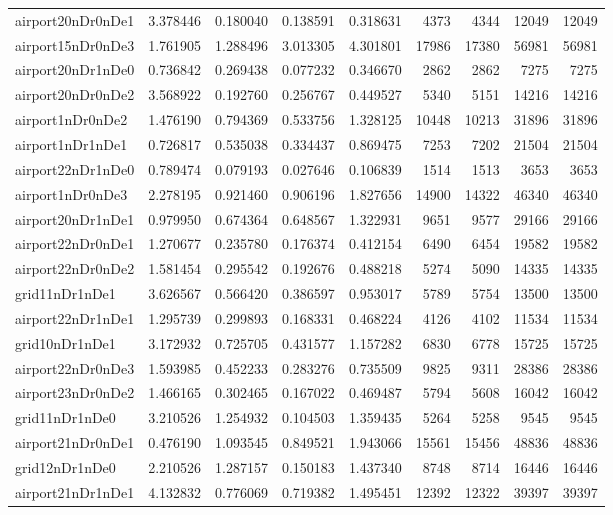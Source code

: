 \begin{longtable}{|l|r|r|r|r|r|r|r|r|}
airport20nDr0nDe1 & 3.378446 & 0.180040 & 0.138591 & 0.318631 & 4373 & 4344 & 12049 & 12049 \\
airport15nDr0nDe3 & 1.761905 & 1.288496 & 3.013305 & 4.301801 & 17986 & 17380 & 56981 & 56981 \\
airport20nDr1nDe0 & 0.736842 & 0.269438 & 0.077232 & 0.346670 & 2862 & 2862 & 7275 & 7275 \\
airport20nDr0nDe2 & 3.568922 & 0.192760 & 0.256767 & 0.449527 & 5340 & 5151 & 14216 & 14216 \\
airport1nDr0nDe2 & 1.476190 & 0.794369 & 0.533756 & 1.328125 & 10448 & 10213 & 31896 & 31896 \\
airport1nDr1nDe1 & 0.726817 & 0.535038 & 0.334437 & 0.869475 & 7253 & 7202 & 21504 & 21504 \\
airport22nDr1nDe0 & 0.789474 & 0.079193 & 0.027646 & 0.106839 & 1514 & 1513 & 3653 & 3653 \\
airport1nDr0nDe3 & 2.278195 & 0.921460 & 0.906196 & 1.827656 & 14900 & 14322 & 46340 & 46340 \\
airport20nDr1nDe1 & 0.979950 & 0.674364 & 0.648567 & 1.322931 & 9651 & 9577 & 29166 & 29166 \\
airport22nDr0nDe1 & 1.270677 & 0.235780 & 0.176374 & 0.412154 & 6490 & 6454 & 19582 & 19582 \\
airport22nDr0nDe2 & 1.581454 & 0.295542 & 0.192676 & 0.488218 & 5274 & 5090 & 14335 & 14335 \\
grid11nDr1nDe1 & 3.626567 & 0.566420 & 0.386597 & 0.953017 & 5789 & 5754 & 13500 & 13500 \\
airport22nDr1nDe1 & 1.295739 & 0.299893 & 0.168331 & 0.468224 & 4126 & 4102 & 11534 & 11534 \\
grid10nDr1nDe1 & 3.172932 & 0.725705 & 0.431577 & 1.157282 & 6830 & 6778 & 15725 & 15725 \\
airport22nDr0nDe3 & 1.593985 & 0.452233 & 0.283276 & 0.735509 & 9825 & 9311 & 28386 & 28386 \\
airport23nDr0nDe2 & 1.466165 & 0.302465 & 0.167022 & 0.469487 & 5794 & 5608 & 16042 & 16042 \\
grid11nDr1nDe0 & 3.210526 & 1.254932 & 0.104503 & 1.359435 & 5264 & 5258 & 9545 & 9545 \\
airport21nDr0nDe1 & 0.476190 & 1.093545 & 0.849521 & 1.943066 & 15561 & 15456 & 48836 & 48836 \\
grid12nDr1nDe0 & 2.210526 & 1.287157 & 0.150183 & 1.437340 & 8748 & 8714 & 16446 & 16446 \\
airport21nDr1nDe1 & 4.132832 & 0.776069 & 0.719382 & 1.495451 & 12392 & 12322 & 39397 & 39397 \\

\end{longtable}
